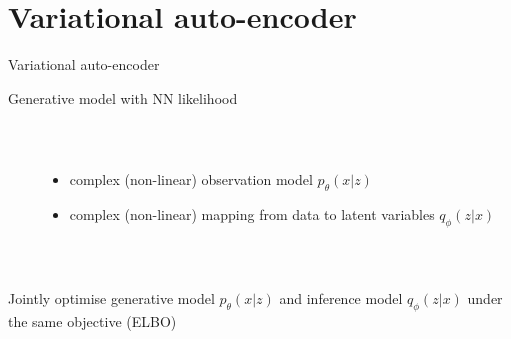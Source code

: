 
\section{Variational auto-encoder}


\begin{frame}{Variational auto-encoder}

Generative model with NN likelihood

~

\begin{columns}
	\begin{column}{0.2\textwidth}
    \end{column}
    \begin{column}{0.7\textwidth}
    	\begin{itemize}
			\item complex (non-linear) observation model $p_\theta(x|z)$
			\item complex (non-linear) mapping from data to latent variables $q_\phi(z|x)$
    	\end{itemize}
    \end{column}
    \end{columns}
    ~
    
    Jointly optimise generative model $p_\theta(x|z)$ and inference model $q_\phi(z|x)$ under the same objective (ELBO)
    
\end{frame}


